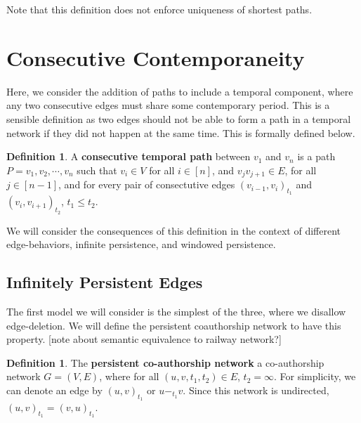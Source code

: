 \documentclass{article}
\theoremstyle{definition}
\newtheorem{defn}[thm]{Definition}
\numberwithin{thm}{subsection}
\begin{document}
Note that this definition does not enforce uniqueness of shortest paths.

\section{Consecutive Contemporaneity}

Here, we consider the addition of paths to include a temporal component, where
any two consecutive edges must share some contemporary period. This is a sensible
definition as two edges should not be able to form a path in a temporal network
if they did not happen at the same time. This is formally defined below.

\begin{defn}
  A \textbf{consecutive temporal path} between $v_1$ and $v_n$ is a path
  $P = v_1, v_2, \cdots, v_n$ such that $v_i \in V$ for all $i \in [n]$,
  and $v_jv_{j+1} \in E$, for all $j \in [n-1]$, and for every pair of
  consectutive edges $(v_{i-1},v_{i})_{t_1}$ and $(v_{i}, v_{i+1})_{t_2}$,
  $t_1 \leq t_2$.
\end{defn}

We will consider the consequences of this definition in the context of different
edge-behaviors, infinite persistence, and windowed persistence.

\subsection{Infinitely Persistent Edges}

The first model we will consider is the simplest of the three, where we disallow
edge-deletion. We will define the persistent coauthorship network to have this
property. [note about semantic equivalence to railway network?]

\begin{defn}
  The \textbf{persistent co-authorship network} a co-authorship network $G = (V,E)$,
  where for all $(u,v,t_1,t_2) \in E$, $t_2 = \infty$. For simplicity, we can
  denote an edge by $(u,v)_{t_1}$ or $u -_{t_1} v$. Since this network is
  undirected, $(u,v)_{t_1} = (v,u)_{t_1}$.
\end{defn}

\begin{center}
\end{center}
\end{document}
